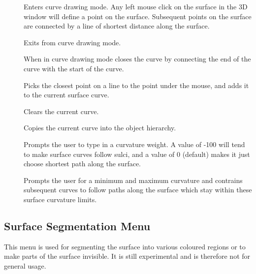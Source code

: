 \begin{description}
\item[]  Enters curve drawing
    mode.  Any left mouse click on the surface in the 3D window will
    define a point on the surface.  Subsequent points on the surface are
    connected by a line of shortest distance along the surface.
\item[]  Exits from curve
    drawing mode.
\item[]  When in curve drawing mode
    closes the curve by connecting the end of the curve with the
    start of the curve.
\item[]  Picks the closest point
    on a line to the point under the mouse, and adds it to the current
    surface curve.
\item[]  Clears the current curve.
\item[]  Copies the current curve
    into the object hierarchy.
\item[]  Prompts the user to type
    in a curvature weight.  A value of -100 will tend to make surface
    curves follow sulci, and a value of 0 (default) makes it just choose
    shortest path along the surface.
\item[]  Prompts the user
    for a minimum and maximum curvature and contrains subsequent curves
    to follow paths along the surface which stay within these surface
    curvature limits.
\end{description}

\subsection{Surface Segmentation Menu}

This menu is used for segmenting the surface into various coloured regions
or to make parts of the surface invisible.  It is still experimental and
is therefore not for general usage.


